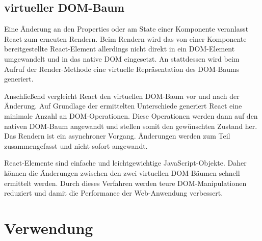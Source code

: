 \subsection{virtueller DOM-Baum }
\label{Rendern}
Eine Änderung an den Properties oder am State einer Komponente veranlasst React zum erneuten Rendern. Beim Rendern wird das von einer Komponente bereitgestellte React-Element allerdings nicht direkt in ein DOM-Element umgewandelt und in das native DOM eingesetzt. An stattdessen wird beim Aufruf der Render-Methode eine virtuelle Repräsentation des DOM-Baums generiert.

Anschließend vergleicht React den virtuellen DOM-Baum vor und nach der Änderung. Auf Grundlage der ermittelten Unterschiede generiert React eine minimale Anzahl an DOM-Operationen.  Diese Operationen werden dann auf den nativen DOM-Baum angewandt und stellen somit den gewünschten Zustand her. Das Rendern ist ein asynchroner Vorgang. Änderungen werden zum Teil zusammengefasst und nicht sofort angewandt.

React-Elemente sind einfache und leichtgewichtige JavaScript-Objekte. Daher können die Änderungen zwischen den zwei virtuellen DOM-Bäumen schnell ermittelt werden. Durch dieses Verfahren werden teure DOM-Manipulationen reduziert und damit die Performance der Web-Anwendung verbessert.\autocites[vgl.][23\psq,60\psq,90\psq]{Zeigermann.2016}[vgl.][53\psq]{Stefanov.2017}[vgl.][]{Facebook.2018}
\section{Verwendung}


